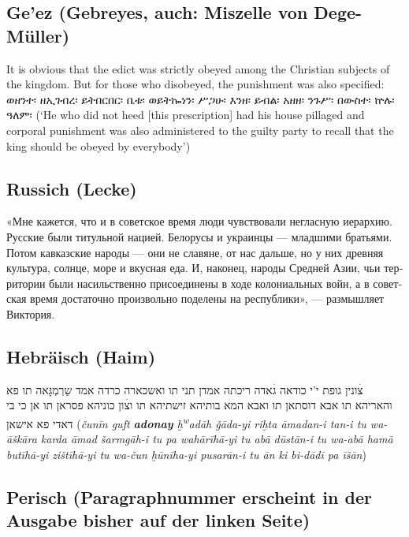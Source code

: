 \documentclass[
  english,
  a4paper,
  DIV=12,
  footlines=2.1,
  usegeometry=true]{scrartcl}
\newcommand{\textamharic}[2][]{\foreignlanguage{amharic}{#2}}
\newcommand{\textrussian}[2][]{\foreignlanguage{russian}{#2}}
\newcommand{\texthebrew}[2][]{\foreignlanguage{hebrew}{#2}}
\begin{document}
\hypertarget{geez-gebreyes-auch-miszelle-von-dege-muxfcller}{%
\subsection{Ge'ez (Gebreyes, auch: Miszelle von
Dege-Müller)}\label{geez-gebreyes-auch-miszelle-von-dege-muxfcller}}

\leavevmode\marginpar{\textcolor{parnum}{{[}13{]}}}It is obvious that
the edict was strictly obeyed among the Christian subjects of the
kingdom. But for those who disobeyed, the punishment was also specified:
\textamharic{ወዘንተ፡ ዘኢገብረ፡ ይትበርበር፡ ቤቱ፡ ወይትኰነን፡ ሥጋሁ፡ እንዘ፡ ይብል፡ አዘዘ፡ ንጉሥ፡
በውስተ፡ ኵሉ፡ ዓለም፡} (`He who did not heed {[}this prescription{]} had his
house pillaged and corporal punishment was also administered to the
guilty party to recall that the king should be obeyed by everybody')

\hypertarget{russich-lecke}{%
\subsection{Russich (Lecke)}\label{russich-lecke}}

\leavevmode\marginpar{\textcolor{parnum}{{[}14{]}}}\textrussian{«Мне
кажется, что и в советское время люди чувствовали негласную иерархию.
Русские были титульной нацией. Белорусы и украинцы --- младшими
братьями. Потом кавказские народы --- они не славяне, от нас дальше, но
у них древняя культура, солнце, море и вкусная еда. И, наконец, народы
Средней Азии, чьи территории были насильственно присоединены в ходе
колониальных войн, а в советская время достаточно произвольно поделены
на республики», --- размышляет Виктория.}

\hypertarget{hebruxe4isch-haim}{%
\subsection{Hebräisch (Haim)}\label{hebruxe4isch-haim}}

\leavevmode\marginpar{\textcolor{parnum}{{[}15{]}}}\texthebrew{צׄונין
גופת י'י כודאה גׄאדה ריכתה אמדן תני תו ואשכארה כרדה אמד שַרְמְגָּאה תו
פא} \texthebrew{והאריהא תו אבא דוסתאן תו ואבא המא בותיהא זישתיהא תו
וצׄון כוניהא פסראן תו אן כי בי דאדי פא אישאן} (\emph{čunīn guft
\textbf{adonay} ḫ\textsuperscript{w}adāh ǧāda-yi riḫta āmadan-i tan-i tu
wa-āškāra karda āmad šarmgāh-i tu pa wahārīhā-yi tu abā dūstān-i tu
wa-abā hamā butīhā-yi zištīhā-yi tu wa-čun ḫūnīha-yi pusarān-i tu ān ki
bi-dādī pa īšān})

\hypertarget{perisch-paragraphnummer-erscheint-in-der-ausgabe-bisher-auf-der-linken-seite}{%
\subsection{Perisch (Paragraphnummer erscheint in der Ausgabe bisher auf
der linken
Seite)}\label{perisch-paragraphnummer-erscheint-in-der-ausgabe-bisher-auf-der-linken-seite}}
\end{document}
